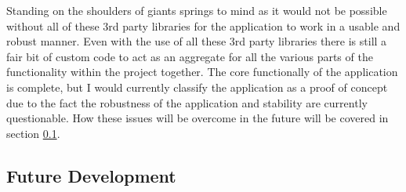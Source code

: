 \noindent
Standing on the shoulders of giants springs to mind as it would not be possible without all of these 3rd party libraries for the application to work in a usable and robust manner. Even with the use of all these 3rd party libraries there is still a fair bit of custom code to act as an aggregate for all the various parts of the functionality within the project together. The core functionally of the application is complete, but I would currently classify the application as a proof of concept due to the fact the robustness of the application and stability are currently questionable. How these issues will be overcome in the future will be covered in section \ref{sec:development_future_dev}.

\subsection{Future Development}
\label{sec:development_future_dev}

